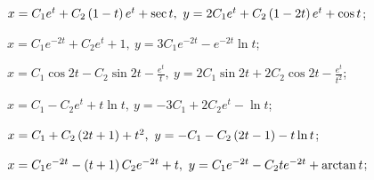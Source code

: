 \begin{enumsolsfull}
		\label{sol:linsys_nonhmg:general}
		\item \( x = C_1e^{t} + C_2 \left( 1-t \right) e^{t} + \sec{t}, ~ y = 2C_1 e^{t} + C_2 \left( 1 - 2t \right) e^t + \cos{t} \); %
		\item \( x = C_1e^{-2t} + C_2e^{t} + 1, ~ y = 3C_1e^{-2t} - e^{-2t} \ln{t} \); %
		\item \( x = C_1 \cos{2t} - C_2 \sin{2t} - \frac{e^t}{t} , ~ y = 2 C_1 \sin{2t} + 2C_2 \cos{2t} - \frac{e^t}{t^2} \); %
		\item \( x = C_1 - C_2 e^{t} + t \ln{t}, ~ y = -3C_1 + 2C_2 e^{t} - \ln{t} \); %
		\item \( x = C_1 + C_2 \left( 2t + 1 \right) + t^2, ~ y = -C_1 - C_2 \left( 2t - 1 \right) - t \ln{t} \); %
		\item \( x = C_1e^{-2t} - \left( t + 1 \right) C_2 e^{-2t} + t, ~ y = C_1 e^{-2t} - C_2t e^{-2t} + \arctan{t} \); %
		

\end{enumsolsfull}
